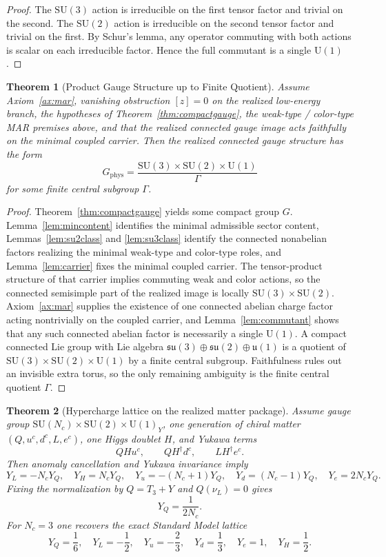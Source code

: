 \documentclass[11pt]{article}
\newtheorem{theorem}{Theorem}[section]
\newcommand{\SU}{\mathrm{SU}}
\newcommand{\U}{\mathrm{U}}
\begin{document}
\begin{proof}
The $\SU(3)$ action is irreducible on the first tensor factor and trivial on the second. The $\SU(2)$ action is irreducible on the second tensor factor and trivial on the first. By Schur's lemma, any operator commuting with both actions is scalar on each irreducible factor. Hence the full commutant is a single $\U(1)$.
\end{proof}

\begin{theorem}[Product Gauge Structure up to Finite Quotient]\label{thm:sm}
Assume Axiom~\ref{ax:mar}, vanishing obstruction $[z]=0$ on the realized low-energy branch, the hypotheses of Theorem~\ref{thm:compactgauge}, the weak-type / color-type MAR premises above, and that the realized connected gauge image acts faithfully on the minimal coupled carrier. Then the realized connected gauge structure has the form
\[
G_{\mathrm{phys}}=
\frac{\SU(3)\times\SU(2)\times\U(1)}{\Gamma}
\]
for some finite central subgroup $\Gamma$.
\end{theorem}

\begin{proof}
Theorem~\ref{thm:compactgauge} yields some compact group $G$. Lemma~\ref{lem:mincontent} identifies the minimal admissible sector content, Lemmas~\ref{lem:su2class} and \ref{lem:su3class} identify the connected nonabelian factors realizing the minimal weak-type and color-type roles, and Lemma~\ref{lem:carrier} fixes the minimal coupled carrier. The tensor-product structure of that carrier implies commuting weak and color actions, so the connected semisimple part of the realized image is locally $\SU(3)\times\SU(2)$. Axiom~\ref{ax:mar} supplies the existence of one connected abelian charge factor acting nontrivially on the coupled carrier, and Lemma~\ref{lem:commutant} shows that any such connected abelian factor is necessarily a single $\U(1)$. A compact connected Lie group with Lie algebra $\mathfrak{su}(3)\oplus\mathfrak{su}(2)\oplus\mathfrak{u}(1)$ is a quotient of $\SU(3)\times\SU(2)\times\U(1)$ by a finite central subgroup. Faithfulness rules out an invisible extra torus, so the only remaining ambiguity is the finite central quotient $\Gamma$.
\end{proof}

\begin{theorem}[Hypercharge lattice on the realized matter package]\label{thm:hypercharge}
Assume gauge group $\SU(N_c)\times\SU(2)\times\U(1)_Y$, one generation of chiral matter $(Q,u^c,d^c,L,e^c)$, one Higgs doublet $H$, and Yukawa terms
\[
QHu^c,\qquad QH^\dagger d^c,\qquad LH^\dagger e^c.
\]
Then anomaly cancellation and Yukawa invariance imply
\[
Y_L=-N_cY_Q,\quad
Y_H=N_cY_Q,\quad
Y_u=-(N_c+1)Y_Q,\quad
Y_d=(N_c-1)Y_Q,\quad
Y_e=2N_cY_Q.
\]
Fixing the normalization by $Q=T_3+Y$ and $Q(\nu_L)=0$ gives
\[
Y_Q=\frac{1}{2N_c}.
\]
For $N_c=3$ one recovers the exact Standard Model lattice
\[
Y_Q=\frac16,\quad
Y_L=-\frac12,\quad
Y_u=-\frac23,\quad
Y_d=\frac13,\quad
Y_e=1,\quad
Y_H=\frac12.
\]
\end{theorem}
\end{document}
